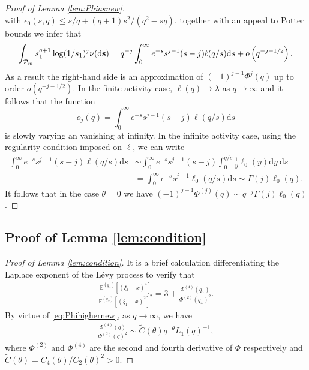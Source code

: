 \documentclass[a4,12pt]{amsart}
\numberwithin{equation}{section}
\newcommand{\MassP}{\mathcal{P}_{\rm m}}
\begin{document}
\begin{appendix}
\begin{proof}[Proof of Lemma \ref{lem:Phiasnew}]
\begin{equation*}
		\end{equation*}
		with $\epsilon_0(s,q) \leq s/q + (q+1) s^2/(q^2-sq)$, 
		together with an appeal to Potter bounds 
		we infer that
		\begin{equation*}
			\int_{\MassP} s_1^{q+1} \log(1/s_1)^j \nu(\mathrm{d} \mathbf{s}) 
			= q^{-j}\int_0^\infty e^{-s}s^{j-1}(s-j) \ell(q/s)\mathrm{d}s + o\left( q^{-j-1/2} \right).
		\end{equation*}
		As a result the right-hand side is an approximation of $(-1)^{j-1}\Phi^j(q)$ up to order $o\left( q^{-j-1/2} \right)$.
        In the finite activity case, $\ell(q) \to \lambda$ as $q \to \infty$ and
        it follows that the function 
        \begin{equation*}
            o_j(q)=\int_0^\infty e^{-s}s^{j-1}(s-j) \ell(q/s)\mathrm{d}s
        \end{equation*}
        is slowly varying an vanishing at infinity.
		In the infinite activity case, 
        using the regularity condition imposed on $\ell$, we can write
		\begin{align*}
			\int_0^\infty e^{-s}s^{j-1}(s-j) \ell(q/s)\mathrm{d}s & \sim
			\int_0^\infty e^{-s}s^{j-1}(s-j) \int_0^{q/s}\frac{1}{y} \ell_0(y) \mathrm{d}y \: \mathrm{d}s \\ 
			& = \int_0^\infty e^{-s}s^{j-1} \ell_0(q/s) \mathrm{d}s \sim \Gamma(j) \ell_0(q).
		\end{align*}
		It follows that in the case $\theta = 0$ we have $(-1)^{j-1}\Phi^{(j)}(q) \sim q^{-j}\Gamma(j)\ell_0(q)$. 

\end{proof}

\color{black}
\subsection{Proof of Lemma \ref{lem:condition}}

\begin{proof}[Proof of Lemma \ref{lem:condition}]
It is a brief calculation differentiating the Laplace exponent of the L\'evy process to verify that
\begin{align*}
\frac{ \mathbb{E}^{(q_x)}[ (\xi_1 - x)^4 ] }{\mathbb{E}^{(q_x)}[ (\xi_1 - x)^2 ]^2   } = 3 + \frac{\Phi^{(4)}(q_x)}{ \Phi^{(2)}(q_x)^2}.
\end{align*} 
By virtue of \eqref{eq:Phihighernew}, as $q \to \infty$, we have 
\begin{align*}
\frac{\Phi^{(4)}(q)}{ \Phi^{(2)}(q)^2} \sim \tilde{C}(\theta) q^{ - \theta} L_1(q)^{-1},
\end{align*}
where $\Phi^{(2)}$ and $\Phi^{(4)}$ are the second and fourth derivative of $\Phi$ respectively
and $\tilde{C}(\theta) = C_4(\theta)/C_2(\theta)^2 > 0$. 


\end{proof}
\end{appendix}
\end{document}
